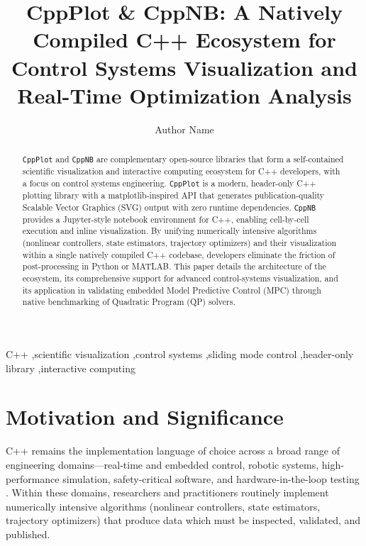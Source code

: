 \documentclass[preprint,12pt]{elsarticle}
\begin{document}
\begin{frontmatter}

\title{CppPlot \& CppNB: A Natively Compiled C++ Ecosystem for Control Systems Visualization and Real-Time Optimization Analysis}

\author[1]{Author Name}

\address[1]{Department of Electrical and Electronics Engineering, Ton Duc Thang University, Ho Chi Minh City, Vietnam}

\begin{abstract}
\texttt{CppPlot} and \texttt{CppNB} are complementary open-source libraries that form a self-contained scientific visualization and interactive computing ecosystem for C++ developers, with a focus on control systems engineering. \texttt{CppPlot} is a modern, header-only C++ plotting library with a matplotlib-inspired API that generates publication-quality Scalable Vector Graphics (SVG) output with zero runtime dependencies. \texttt{CppNB} provides a Jupyter-style notebook environment for C++, enabling cell-by-cell execution and inline visualization. By unifying numerically intensive algorithms (nonlinear controllers, state estimators, trajectory optimizers) and their visualization within a single natively compiled C++ codebase, developers eliminate the friction of post-processing in Python or MATLAB. This paper details the architecture of the ecosystem, its comprehensive support for advanced control-systems visualization, and its application in validating embedded Model Predictive Control (MPC) through native benchmarking of Quadratic Program (QP) solvers.
\end{abstract}

\begin{keyword}
C++ \sep scientific visualization \sep control systems \sep sliding mode control \sep header-only library \sep interactive computing
\end{keyword}

\end{frontmatter}

\section{Motivation and Significance}
\label{sec:motivation}

C++ remains the implementation language of choice across a broad range of engineering domains—real-time and embedded control, robotic systems, high-performance simulation, safety-critical software, and hardware-in-the-loop testing \cite{Stroustrup2013}. Within these domains, researchers and practitioners routinely implement numerically intensive algorithms (nonlinear controllers, state estimators, trajectory optimizers) that produce data which must be inspected, validated, and published. 
\end{document}
